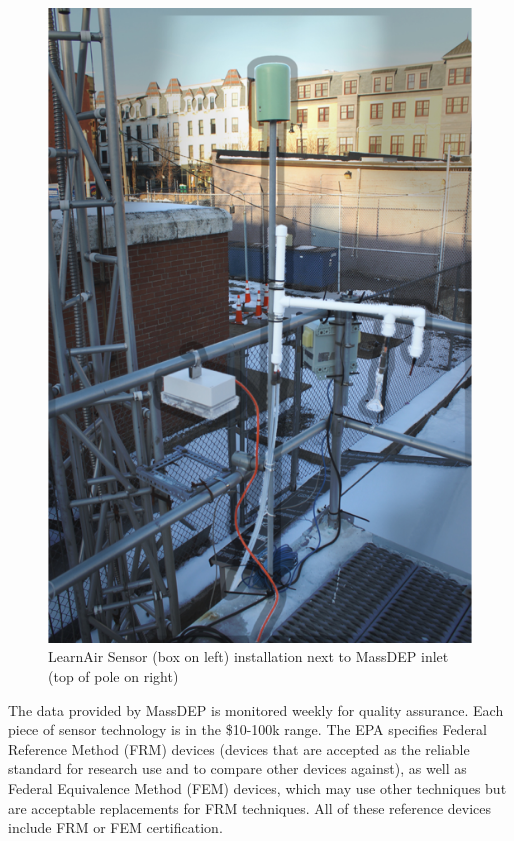 \begin{figure}[htb]
 	\includegraphics[width=\textwidth]{visuals/epa_zoom}               
 	 \caption{LearnAir Sensor (box on left) installation next to MassDEP inlet (top of pole on right)}
  	\label{fig:epa_zoom}
\end{figure}

The data provided by MassDEP is monitored weekly for quality assurance.  Each piece of sensor technology is in the \$10-100k range.  The EPA specifies Federal Reference Method (FRM) devices (devices that are accepted as the reliable standard for research use and to compare other devices against), as well as Federal Equivalence Method (FEM) devices, which may use other techniques but are acceptable replacements for FRM techniques.  All of these reference devices include FRM or FEM certification.

